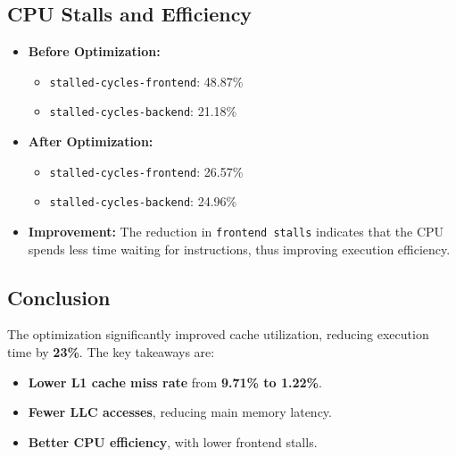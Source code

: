 \documentclass{article}
\begin{document}
\subsection{CPU Stalls and Efficiency}
\begin{itemize}
    \item \textbf{Before Optimization:}
    \begin{itemize}
        \item \texttt{stalled-cycles-frontend}: 48.87\%
        \item \texttt{stalled-cycles-backend}: 21.18\%
    \end{itemize}
    \item \textbf{After Optimization:}
    \begin{itemize}
        \item \texttt{stalled-cycles-frontend}: 26.57\%
        \item \texttt{stalled-cycles-backend}: 24.96\%
    \end{itemize}
    \item \textbf{Improvement:} The reduction in \texttt{frontend stalls} indicates that the CPU spends less time waiting for instructions, thus improving execution efficiency.
\end{itemize}

\subsection{Conclusion}
The optimization significantly improved cache utilization, reducing execution time by \textbf{23\%}. The key takeaways are:
\begin{itemize}
    \item \textbf{Lower L1 cache miss rate} from \textbf{9.71\% to 1.22\%}.
    \item \textbf{Fewer LLC accesses}, reducing main memory latency.
    \item \textbf{Better CPU efficiency}, with lower frontend stalls.
\end{itemize}
\end{document}
